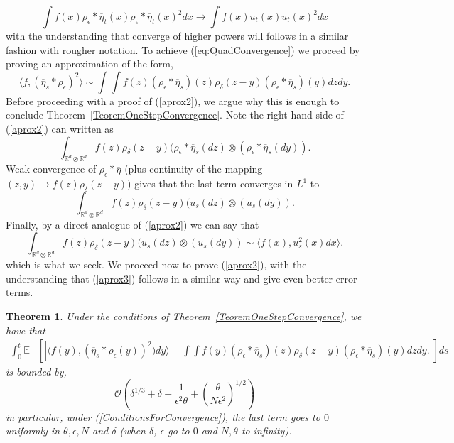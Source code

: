 \documentclass[12pt]{article}
\newtheorem{theorem}{Theorem}[section]
\begin{document}
\begin{equation} \label{eq:QuadConvergence} \int f(x) \rho_\epsilon * \overline{\eta}_t(x) \rho_\epsilon * \overline{\eta}_t(x)^2 dx \rightarrow \int f(x) u_t(x) u_t(x)^2 dx \end{equation}
with the understanding that converge of higher powers will follows in a similar fashion with rougher notation. To achieve (\ref{eq:QuadConvergence}) we proceed by proving an approximation of the form,
\begin{equation}
\label{aprox2}
\langle f, (\overline{\eta}_s * \rho_\epsilon)^2 \rangle \sim \int \int f(z) (\rho_\epsilon * \overline{\eta}_s)(z) \rho_\delta (z-y) (\rho_\epsilon * \overline{\eta}_s)(y) dz dy.
\end{equation}
Before proceeding with a proof of (\ref{aprox2}), we argue why this is enough to conclude Theorem~\ref{TeoremOneStepConvergence}. Note the right hand side of (\ref{aprox2}) can written as
\[ \int_{\mathbb{R}^{d} \otimes \mathbb{R}^d} f(z) \rho_\delta(z-y) (\rho_\epsilon * \overline{\eta}_s(dz) \otimes (\rho_\epsilon * \overline{\eta}_s(dy)). \]
Weak convergence of $\rho_\epsilon * \overline{\eta}$ (plus continuity of the mapping $(z,y) \rightarrow f(z) \rho_\delta(z-y)$) gives that the last term converges in $L^1$ to
\[ \int_{\mathbb{R}^{d} \otimes \mathbb{R}^d} f(z) \rho_\delta(z-y) (u_s(dz) \otimes (u_s(dy)). \]
Finally, by a direct analogue of (\ref{aprox2}) we can say that
\begin{equation} \int_{\mathbb{R}^{d} \otimes \mathbb{R}^d} f(z) \rho_\delta(z-y) (u_s(dz) \otimes (u_s(dy)) \sim \langle f(x), u_s^2(x) dx \rangle. \label{aprox3} \end{equation}
which is what we seek. We proceed now to prove (\ref{aprox2}), with the understanding that (\ref{aprox3}) follows in a similar way and give even better error terms.
\begin{theorem}
Under the conditions of Theorem~\ref{TeoremOneStepConvergence}, we have that
\begin{align*}
\int_0^t \mathbb{E}&\left[\left| \langle f(y), (\overline{\eta}_s * \rho_\epsilon(y))^2) dy\rangle - \int \int f(y) (\rho_\epsilon * \overline{\eta}_s)(z) \rho_\delta (z-y) (\rho_\epsilon * \overline{\eta}_s)(y) dz dy. \right|\right] ds
\end{align*}
is bounded by,
\[  \mathcal{O}\left(\delta^{1/3} + \delta +  \frac{1}{\epsilon^2 \theta} + \left( \frac{\theta}{N \epsilon^2}\right)^{1/2} \right)  \]
in particular, under (\ref{ConditionsForConvergence}), the last term goes to $0$ uniformly in $\theta,\epsilon,N$ and $\delta$ (when $\delta$, $\epsilon$ go to $0$ and $N,\theta$ to infinity).
\end{theorem}
\end{document}
